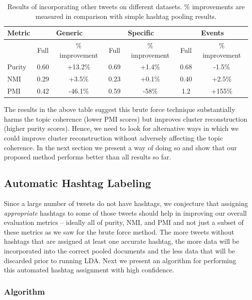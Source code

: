 \documentclass[10pt,a5paper,twoside]{article}
\begin{document}
\begin{table}[!h]
\centering
{
	\begin{tabular}{|l|cc|cc|cc|}
	\hline
	Metric  & \multicolumn {2}{c}{Generic} & \multicolumn {2}{c}{Specific} & \multicolumn {2}{c|}{Events}\\
	\hline
	 & Full & \% improvement & Full & \% improvement & Full & \% improvement\\
	\hline
	Purity & 0.60 & +13.2\% & 0.69 & +1.4\% & 0.68 & -1.5\% \\
	\hline
	NMI & 0.29 & +3.5\% & 0.23 & +0.1\% & 0.40 & +2.5\% \\
	\hline
	PMI & 0.42 & -46.1\% & 0.59 & -58\% & 1.2 & +155\% \\
	\hline
	\end{tabular}
}
\caption{Results of incorporating other tweets on different datasets. \% improvements are measured in comparison with simple hashtag pooling results.}\label{tbl-8}
\end{table}

The results in the above table suggest this brute force technique
substantially harms the topic coherence (lower PMI scores) but
improves cluster reconstruction (higher purity scores).  Hence, we
need to look for alternative ways in which we could improve cluster
reconstruction without adversely affecting the topic coherence. In the
next section we present a way of doing so and show that our proposed
method performs better than all results so far.

\subsection{Automatic Hashtag Labeling}

\label{subsec:assign_hashtags}

Since a large number of tweets do not have hashtags, we conjecture
that assigning \emph{appropriate} hashtags to some of those tweets
should help in improving our overall evaluation metrics -- ideally all
of purity, NMI, and PMI and not just a subset of these metrics as we
saw for the brute force method.  The more tweets without hashtags that
are assigned at least one accurate hashtag, the more data will be
incorporated into the correct pooled documents and the less data that
will be discarded prior to running LDA.  Next we present an algorithm
for performing this automated hashtag assignment with high confidence.

\subsubsection{Algorithm}
\end{document}
